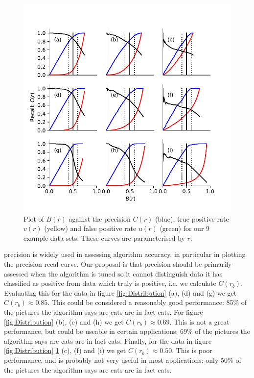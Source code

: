 \documentclass[preprint,12pt]{elsarticle}
\begin{document}
\begin{figure}[t]
\centering
\includegraphics[scale=1]{Article/Figures/Balance.pdf}
\caption{Plot of $B(r)$ against the precision $C(r)$ (blue), true positive rate $v(r)$ (yellow) and false positive rate $u(r)$ (green) for our 9 example data sets. These curves are parameterised by $r$. }
\label{fig:balance}
\end{figure}

precision is widely used in assessing algorithm accuracy, in particular in plotting the precision-recal curve. Our proposal is that precision should be primarily assessed when the algorithm is tuned so it cannot distinguish data it has classified as positive from data which truly is positive, i.e. we calculate $C(r_b)$. Evaluating this for the data in figure \ref{fig:Distribution} (a), (d) and (g) we get $C(r_b) \approx  0.85$. This could be considered a reasonably good performance: 85\% of the pictures the algorithm says are cats are in fact cats. For figure \ref{fig:Distribution}  (b), (e) and (h) we get $C(r_b) \approx 0.69$. This is not a great performance, but could be useable in certain applications: 69\% of the pictures the algorithm says are cats are in fact cats. Finally, for the data in figure \ref{fig:Distribution} \ref{fig:balance} (c), (f) and (i) we get $C(r_b) \approx  0.50$. This is poor performance, and is probably not very useful in most applications: only 50\% of the pictures the algorithm says are cats are in fact cats. 
\end{document}
